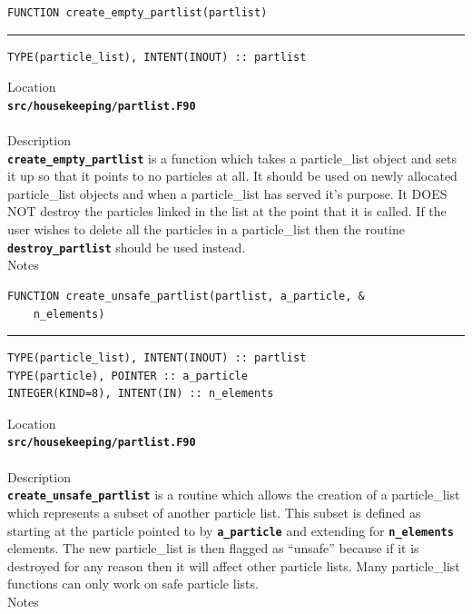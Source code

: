 \documentclass[12pt,a4paper]{article}
\newcommand{\HRule}{\rule{\linewidth}{0.5mm}}
\newcommand{\inlinecode}[1]{{\color{warwickred} \bf\texttt{#1}}}
\newcommand{\codedef}{\begin{Verbatim}[formatcom=\color{warwickred},fontsize=\Large,hfuzz=0pt]}
\newcommand{\coderule}{
{\color{warwickred}\vspace{-0.5cm}\HRule}
\codedef}
\begin{document}
\pagebreak
\codedef
FUNCTION create_empty_partlist(partlist)
\end{Verbatim}
\coderule
TYPE(particle_list), INTENT(INOUT) :: partlist
\end{Verbatim}
\vspace{1cm}
{\Large Location\\}
\inlinecode{src/housekeeping/partlist.F90}\\
\\[0.5cm]
{\Large Description\\}
\inlinecode{create\_empty\_partlist} is a function which takes a particle\_list
object and sets it up so that it points to no particles at all. It should be
used on newly allocated particle\_list objects and when a particle\_list has served
it's purpose. It DOES NOT destroy the particles linked in the list at the point
that it is called. If the user wishes to delete all the particles in a
particle\_list then the routine \inlinecode{destroy\_partlist} should be used
instead.
\\[0.5cm]
{\Large Notes\\}

\pagebreak
\codedef
FUNCTION create_unsafe_partlist(partlist, a_particle, &
    n_elements)
\end{Verbatim}
\coderule
TYPE(particle_list), INTENT(INOUT) :: partlist
TYPE(particle), POINTER :: a_particle
INTEGER(KIND=8), INTENT(IN) :: n_elements
\end{Verbatim}
\vspace{1cm}
{\Large Location\\}
\inlinecode{src/housekeeping/partlist.F90}\\
\\[0.5cm]
{\Large Description\\}
\inlinecode{create\_unsafe\_partlist} is a routine which allows the creation of
a particle\_list which represents a subset of another particle list. This subset
is defined as starting at the particle pointed to by \inlinecode{a\_particle} and
extending for \inlinecode{n\_elements} elements. The new particle\_list is then
flagged as ``unsafe'' because if it is destroyed for any reason then it will
affect other particle lists. Many particle\_list functions can only work on safe
particle lists.
\\[0.5cm]
{\Large Notes\\}
\end{document}
